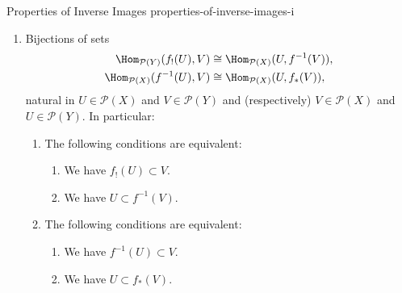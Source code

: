 \begin{proposition}{Properties of Inverse Images \rmI}{properties-of-inverse-images-i}
\begin{enumerate}
\begin{enumerate}
\[\begin{gathered}
                            f_{!}(f^{-1}(V)) \subset V,
                        \end{gathered}
                        \qquad
                        \begin{gathered}
                            V                \subset f_{*}(f^{-1}(V)),\\
                            f^{-1}(f_{*}(U)) \subset U
                        \end{gathered}
                    \]%
                    indexed by $U\in\mathcal{P}(X)$ and $V\in\mathcal{P}(Y)$.
                \item\label{properties-of-inverse-images-i-triple-adjointness-2}Bijections of sets
                    \begin{align*}
                        \Hom_{\mathcal{P}(Y)}(f_{!}(U),V)  &\cong \Hom_{\mathcal{P}(X)}(U,f^{-1}(V)),\\
                        \Hom_{\mathcal{P}(X)}(f^{-1}(U),V) &\cong \Hom_{\mathcal{P}(X)}(U,f_{*}(V)),
                    \end{align*}
                    natural in $U\in\mathcal{P}(X)$ and $V\in\mathcal{P}(Y)$ and (respectively) $V\in\mathcal{P}(X)$ and $U\in\mathcal{P}(Y)$. In particular:
                    \begin{enumerate}
                        \item\label{properties-of-inverse-images-i-triple-adjointness-2-a}The following conditions are equivalent:
                            \begin{enumerate}
                                \item\label{properties-of-inverse-images-i-triple-adjointness-2-a-i}We have $f_{!}(U)\subset V$.
                                \item\label{properties-of-inverse-images-i-triple-adjointness-2-a-ii}We have $U\subset f^{-1}(V)$.
                            \end{enumerate}
                        \item\label{properties-of-inverse-images-i-triple-adjointness-2-b}The following conditions are equivalent:
                            \begin{enumerate}
                                \item\label{properties-of-inverse-images-i-triple-adjointness-2-b-i}We have $f^{-1}(U)\subset V$.
                                \item\label{properties-of-inverse-images-i-triple-adjointness-2-b-ii}We have $U\subset f_{*}(V)$.

\end{enumerate}
\end{enumerate}
\end{enumerate}
\end{enumerate}
\end{proposition}
